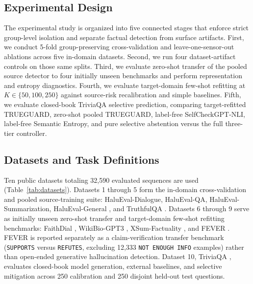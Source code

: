 \documentclass{ieeeaccess}
\begin{document}
\subsection{Experimental Design}
The experimental study is organized into five connected stages that enforce strict group-level isolation and separate factual detection from surface artifacts. First, we conduct 5-fold group-preserving cross-validation and leave-one-sensor-out ablations across five in-domain datasets. Second, we run four dataset-artifact controls on those same splits. Third, we evaluate zero-shot transfer of the pooled source detector to four initially unseen benchmarks and perform representation and entropy diagnostics. Fourth, we evaluate target-domain few-shot refitting at $K \in \{50, 100, 250\}$ against source-risk recalibration and simple baselines. Fifth, we evaluate closed-book TriviaQA selective prediction, comparing target-refitted TRUEGUARD, zero-shot pooled TRUEGUARD, label-free SelfCheckGPT-NLI, label-free Semantic Entropy, and pure selective abstention versus the full three-tier controller.

\subsection{Datasets and Task Definitions}
Ten public datasets totaling 32,590 evaluated sequences are used (Table~\ref{tab:datasets}). Datasets 1 through 5 form the in-domain cross-validation and pooled source-training suite: HaluEval-Dialogue, HaluEval-QA, HaluEval-Summarization, HaluEval-General \cite{review29}, and TruthfulQA \cite{review22}. Datasets 6 through 9 serve as initially unseen zero-shot transfer and target-domain few-shot refitting benchmarks: FaithDial \cite{dziri2022faithdial}, WikiBio-GPT3 \cite{review21}, XSum-Factuality \cite{maynez2020faithfulness}, and FEVER \cite{thorne2018fever}. FEVER is reported separately as a claim-verification transfer benchmark (\texttt{SUPPORTS} versus \texttt{REFUTES}, excluding 12,333 \texttt{NOT ENOUGH INFO} examples) rather than open-ended generative hallucination detection. Dataset 10, TriviaQA \cite{joshi2017triviaqa}, evaluates closed-book model generation, external baselines, and selective mitigation across 250 calibration and 250 disjoint held-out test questions.
\end{document}
